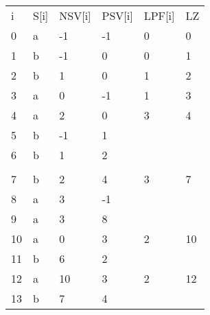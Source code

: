\begin{table}[h]
\begin{tabular}{llllll}
i  & S{[}i{]} & NSV{[}i{]} & PSV{[}i{]} & LPF{[}i{]} & LZ \\
0  & a        & -1         & -1         & 0          & 0  \\
1  & b        & -1         & 0          & 0          & 1  \\
2  & b        & 1          & 0          & 1          & 2  \\
3  & a        & 0          & -1         & 1          & 3  \\
4  & a        & 2          & 0          & 3          & 4  \\
5  & b        & -1         & 1          &            &    \\
6  & b        & 1          & 2          &            &    \\
   &          &            &            &            &    \\
7  & b        & 2          & 4          & 3          & 7  \\
8  & a        & 3          & -1         &            &    \\
9  & a        & 3          & 8          &            &    \\
10 & a        & 0          & 3          & 2          & 10 \\
11 & b        & 6          & 2          &            &    \\
12 & a        & 10         & 3          & 2          & 12 \\
13 & b        & 7          & 4          &            &   
\end{tabular}
\end{table}

